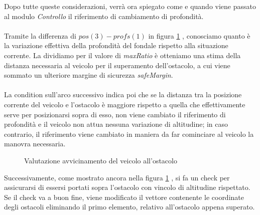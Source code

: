 \documentclass{article}
\begin{document}
            Dopo tutte queste considerazioni, verrà ora spiegato come e quando viene passato al modulo \textit{Controllo} il riferimento di cambiamento di profondità.\\
            \\
            Tramite la differenza di $pos(3) - profs(1)$ in figura \ref{fig:obs2} , conosciamo quanto è la variazione 
            effettiva della profondità del fondale rispetto alla situazione corrente. La dividiamo per il valore di \emph{maxRatio} è otteniamo una stima della distanza
            necessaria al veicolo per il superamento dell'ostacolo, a cui viene sommato un ulteriore margine di sicurezza \emph{safeMargin}.\\
            \\
            La condition sull'arco successivo indica poi che se la distanza tra la posizione corrente del veicolo e l'ostacolo è maggiore rispetto a 
            quella che effettivamente serve per posizionarsi sopra di esso, non viene cambiato il riferimento di profondità e il 
            veicolo non attua nessuna variazione di altitudine; in caso contrario, il riferimento viene cambiato in maniera da far cominciare al veicolo la manovra necessaria.

            
            \begin{figure} [ht]
                \caption{Valutazione avvicinamento del veicolo all'ostacolo}
                \label{fig:obs2}
            \end{figure}

            Successivamente, come mostrato ancora nella figura \ref{fig:obs2} , si fa un check per assicurarsi di essersi portati sopra l'ostacolo con vincolo di altitudine 
            rispettato. Se il check va a buon fine, viene modificato il vettore contenente le coordinate degli ostacoli eliminando il primo elemento, relativo all'ostacolo 
            appena superato.
\end{document}

